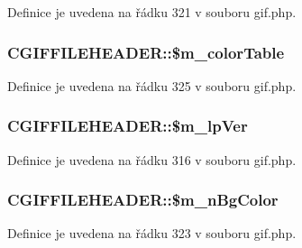 Definice je uvedena na řádku 321 v souboru gif.\-php.

\hypertarget{class_c_g_i_f_f_i_l_e_h_e_a_d_e_r_a2f20165667d814c639876c8088438ea2}{
\subsubsection[{\$m\-\_\-color\-Table}]{\setlength{\rightskip}{0pt plus 5cm}C\-G\-I\-F\-F\-I\-L\-E\-H\-E\-A\-D\-E\-R\-::\$m\-\_\-color\-Table}}\label{class_c_g_i_f_f_i_l_e_h_e_a_d_e_r_a2f20165667d814c639876c8088438ea2}


Definice je uvedena na řádku 325 v souboru gif.\-php.

\hypertarget{class_c_g_i_f_f_i_l_e_h_e_a_d_e_r_a7c6cf88bf099e8c6d038e6e394b64222}{
\subsubsection[{\$m\-\_\-lp\-Ver}]{\setlength{\rightskip}{0pt plus 5cm}C\-G\-I\-F\-F\-I\-L\-E\-H\-E\-A\-D\-E\-R\-::\$m\-\_\-lp\-Ver}}\label{class_c_g_i_f_f_i_l_e_h_e_a_d_e_r_a7c6cf88bf099e8c6d038e6e394b64222}


Definice je uvedena na řádku 316 v souboru gif.\-php.

\hypertarget{class_c_g_i_f_f_i_l_e_h_e_a_d_e_r_a8aca427894a908f1701c0ae5853538fe}{
\subsubsection[{\$m\-\_\-n\-Bg\-Color}]{\setlength{\rightskip}{0pt plus 5cm}C\-G\-I\-F\-F\-I\-L\-E\-H\-E\-A\-D\-E\-R\-::\$m\-\_\-n\-Bg\-Color}}\label{class_c_g_i_f_f_i_l_e_h_e_a_d_e_r_a8aca427894a908f1701c0ae5853538fe}


Definice je uvedena na řádku 323 v souboru gif.\-php.

